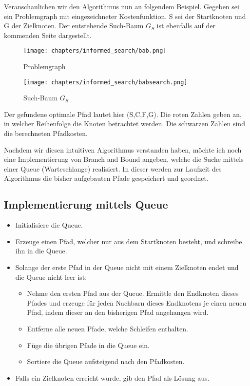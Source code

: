 Veranschaulichen wir den Algorithmus nun an folgendem Beispiel. Gegeben sei ein Problemgraph mit eingezeichneter Kostenfunktion. S sei der Startknoten und G der Zielknoten. Der entstehende Such-Baum $G_{S}$ ist ebenfalls auf der kommenden Seite dargestellt.

\begin{figure}[h!]
	\texttt{[image: chapters/informed\_search/bab.png]}
	\caption{Problemgraph}
	\label{fig:figure3}
\end{figure}

\begin{figure}[h!]
	\texttt{[image: chapters/informed\_search/babsearch.png]}
	\caption{Such-Baum $G_{S}$}
	\label{fig:figure4}
\end{figure}

Der gefundene optimale Pfad lautet hier (S,C,F,G).
Die roten Zahlen geben an, in welcher Reihenfolge die Knoten betrachtet werden. Die schwarzen Zahlen sind die berechneten Pfadkosten.

Nachdem wir diesen intuitiven Algorithmus verstanden haben, möchte ich noch eine Implementierung von Branch and Bound angeben, welche die Suche mittels einer Queue (Warteschlange) realisiert. In dieser werden zur Laufzeit des Algorithmus die bisher aufgebauten Pfade gespeichert und geordnet.

\subsection{Implementierung mittels Queue}

\begin{itemize}
	\item Initialisiere die Queue.
	\item Erzeuge einen Pfad, welcher nur aus dem Startknoten besteht, und schreibe ihn in die Queue.
	\item Solange der erste Pfad in der Queue nicht mit einem Zielknoten endet und die Queue nicht leer ist:
	\begin{itemize}
		\item Nehme den ersten Pfad aus der Queue. Ermittle den Endknoten dieses Pfades und erzeuge für jeden Nachbarn dieses Endknotens je einen neuen Pfad, indem dieser an den bisherigen Pfad angehangen wird.
		\item Entferne alle neuen Pfade, welche Schleifen enthalten.
		\item Füge die übrigen Pfade in die Queue ein.
		\item Sortiere die Queue aufsteigend nach den Pfadkosten.
	\end{itemize}
	\item Falls ein Zielknoten erreicht wurde, gib den Pfad als Lösung aus.
\end{itemize}

